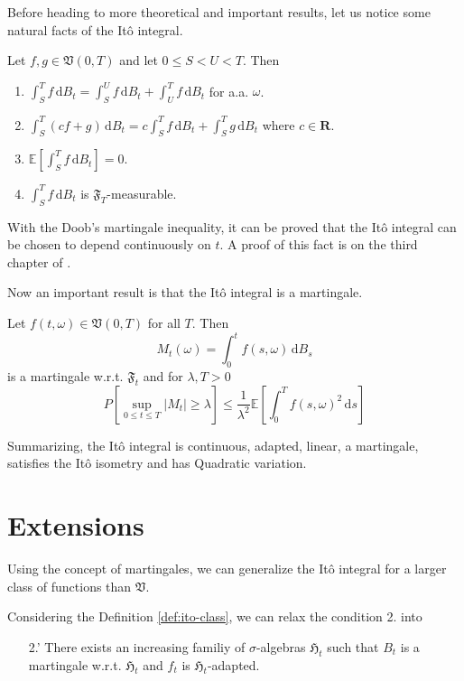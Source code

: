 Before heading to more theoretical and important results, let us notice some natural facts of the Itô integral.

\begin{theorem}
	Let $f, g \in \mathfrak{V}(0,T)$ and let $0 \leq S < U < T$. Then
	\begin{enumerate}
		\item $\int_S^T f \, \mathrm{d}B_t = \int_S^U f \, \mathrm{d}B_t + \int_U^T f \, \mathrm{d}B_t$ for a.a. $\omega$.
		\item $\int_S^T (cf + g) \, \mathrm{d}B_t = c \int_S^T f \, \mathrm{d}B_t + \int_S^T g \, \mathrm{d}B_t$ where $c \in \textbf{R}$.
		\item $\mathbb{E} \left[ \int_S^T f \, \mathrm{d}B_t \right] = 0$.
		\item $\int_S^T f \, \mathrm{d}B_t$ is $\mathfrak{F}_T$-measurable.
	\end{enumerate}
\end{theorem}

With the Doob's martingale inequality, it can be proved that the Itô integral can be chosen to depend continuously on $t$. A proof of this fact is on the third chapter of \cite{oksendal2013stochastic}.

Now an important result is that the Itô integral is a martingale.

\begin{theorem}
	Let $f(t, \omega) \in \mathfrak{V}(0,T)$ for all $T$. Then
	\[
		M_t(\omega)  = \int_0^t f(s,\omega)\, \mathrm{d}B_s
	\]
	is a martingale w.r.t. $\mathfrak{F}_t$ and for $\lambda, T > 0$
	\[
		P \left[ \sup_{0 \leq t \leq T} |M_t| \geq \lambda \right] \leq \frac{1}{\lambda^2} \mathbb{E} \left[ \int_0^T f(s,\omega)^2 \, \mathrm{d}s \right]
	\]
\end{theorem}

Summarizing, the Itô integral is continuous, adapted, linear, a martingale, satisfies the Itô isometry and has Quadratic variation.

\section{Extensions}

Using the concept of martingales, we can generalize the Itô integral for a larger class of functions than $\mathfrak{V}$.

Considering the Definition \ref{def:ito-class}, we can relax the condition 2. into
\begin{itemize}
	\item[2.'] There exists an increasing familiy of $\sigma$-algebras $\mathfrak{H}_t$ such that $B_t$ is a martingale w.r.t. $\mathfrak{H}_t$ and $f_t$ is $\mathfrak{H}_t$-adapted.
\end{itemize}

